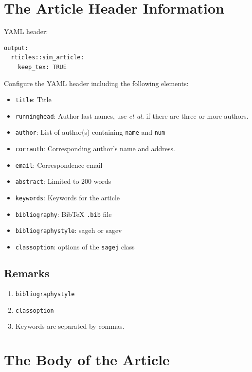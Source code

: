 \documentclass[Royal,times,sageh]{sagej}
\begin{document}
\hypertarget{the-article-header-information}{%
\section{The Article Header
Information}\label{the-article-header-information}}

YAML header:

\begin{verbatim}
output:
  rticles::sim_article:
    keep_tex: TRUE
\end{verbatim}

Configure the YAML header including the following elements:

\begin{itemize}
\item
  \texttt{title}: Title
\item
  \texttt{runninghead}: Author last names, use \emph{et al.} if there
  are three or more authors.
\item
  \texttt{author}: List of author(s) containing \texttt{name} and
  \texttt{num}
\item
  \texttt{corrauth}: Corresponding author's name and address.
\item
  \texttt{email}: Correspondence email
\item
  \texttt{abstract}: Limited to 200 words
\item
  \texttt{keywords}: Keywords for the article
\item
  \texttt{bibliography}: BibTeX \texttt{.bib} file
\item
  \texttt{bibliographystyle}: sageh or sagev
\item
  \texttt{classoption}: options of the \texttt{sagej} class
\end{itemize}

\hypertarget{remarks}{%
\subsection{Remarks}\label{remarks}}

\begin{enumerate}
\def\labelenumi{\arabic{enumi}.}
\setcounter{enumi}{1}
\item
  \texttt{bibliographystyle}
\item
  \texttt{classoption}
\item
  Keywords are separated by commas.
\end{enumerate}

\hypertarget{the-body-of-the-article}{%
\section{The Body of the Article}\label{the-body-of-the-article}}
\end{document}
